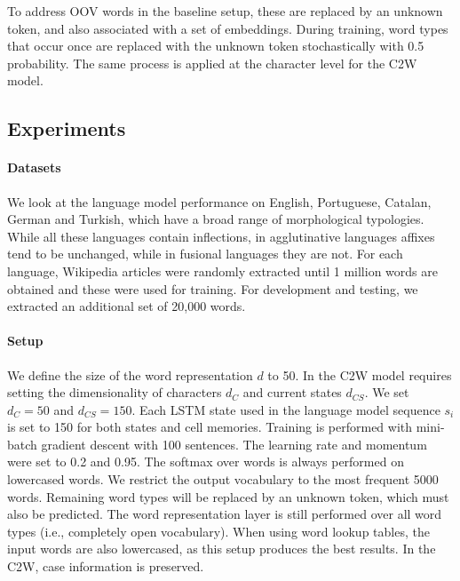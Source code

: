\documentclass[11pt]{article}
\newcommand{\ignore}[1]{}
\begin{document}
\begin{CJK*}{UTF8}{gbsn}
To address OOV words in the baseline setup, these are replaced by an unknown token, and also associated with a set of embeddings. During training, word types that occur once are replaced with the unknown token stochastically with 0.5 probability. The same process is applied at the character level for the C2W model.

\subsection{Experiments}
\paragraph{Datasets}
\ignore{Languages can be characterized by the morphological processes they use as being either analytic or synthetic. Analytic languages, such as English, contain relatively little inflection, and rely on word order and auxiliary words to express grammatical relations. Synthetic languages can be further divided into fusional and agglutinative languages. While both allow words to be inflected, . }
We look at the language model performance on English, Portuguese, Catalan, German and Turkish, which have a broad range of morphological typologies. While all these languages contain inflections, in agglutinative languages affixes tend to be unchanged, while in fusional languages they are not. For each language, Wikipedia articles were randomly extracted until 1 million words are obtained and these were used for training. For development and testing, we extracted an additional set of 20,000 words.

\paragraph{Setup}
We define the size of the word representation $d$ to 50. In the C2W model requires setting the dimensionality of characters $d_C$ and current states $d_{CS}$. We set $d_C=50$ and $d_{CS}=150$. Each LSTM state used in the language model sequence $s_i$ is set to 150 for both states and cell memories. Training is performed with mini-batch gradient descent with 100 sentences. The learning rate and momentum were set to 0.2 and 0.95. The softmax over words is always performed on lowercased words. \ignore{the softmax operation can be computationally expensive to compute over large vocabularies 100K words. While there are more efficient methods to approximate the softmax function~\cite{Mnih12afast}, as our work is focused on learning better representations, we decided to use a simpler approach.} We restrict the output vocabulary to the most frequent 5000 words. Remaining word types will be replaced by an unknown token, which must also be predicted. The word representation layer is still performed over all word types (i.e., completely open vocabulary). When using word lookup tables, the input words are also lowercased, as this setup produces the best results. In the C2W, case information is preserved. 


\end{CJK*}
\end{document}
